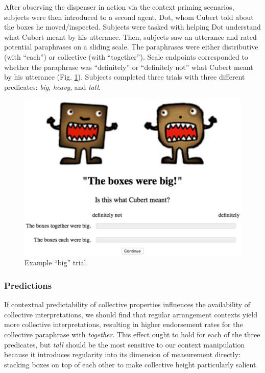 \documentclass[linguex]{sp}
\begin{document}
After observing the dispenser in action via the context priming scenarios, subjects were then introduced to a second agent, Dot, whom Cubert told about the boxes he moved/inspected. Subjects were tasked with helping Dot understand what Cubert meant by his utterance. Then, subjects saw an utterance and rated potential paraphrases on a sliding scale. The paraphrases were either distributive (with  ``each'') or collective (with ``together'').  Scale endpoints corresponded to whether the paraphrase was ``definitely'' or ``definitely not'' what Cubert meant by his utterance (Fig. \ref{trial}). Subjects completed three trials with three different predicates: \emph{big}, \emph{heavy}, and \emph{tall}.


\begin{figure}[h]
\centering
\includegraphics[width=4.5in]{images/trial.eps}
\caption{Example ``big'' trial.}\label{trial}
\end{figure}

\subsubsection{Predictions}

If contextual predictability of collective properties influences the availability of collective interpretations, we should find that regular arrangement contexts yield more collective interpretations, resulting in higher endorsement rates for the collective paraphrase with \emph{together}. This effect ought to hold for each of the three predicates, but \emph{tall} should be the most sensitive to our context manipulation because it introduces regularity into its dimension of measurement directly: stacking boxes on top of each other to make collective height particularly salient.
\end{document}
